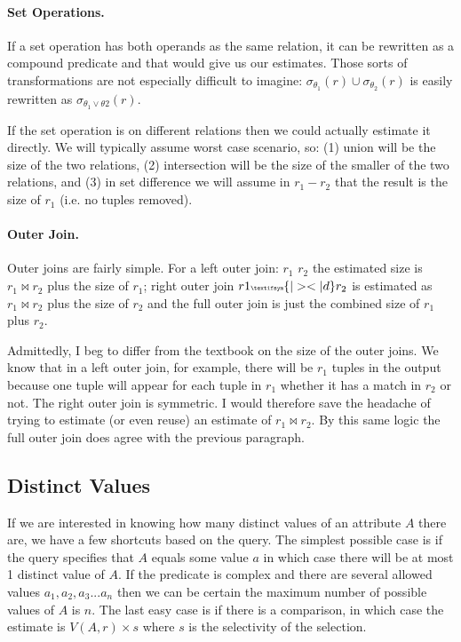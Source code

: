 \paragraph{Set Operations.}

If a set operation has both operands as the same relation, it can be rewritten as a compound predicate and that would give us our estimates. Those sorts of transformations are not especially difficult to imagine: $\sigma_{\theta_{1}}(r) \cup \sigma_{\theta_{2}}(r)$ is easily rewritten as $\sigma_{\theta_{1} \vee \theta{2}}(r)$. 

If the set operation is on different relations then we could actually estimate it directly. We will typically assume worst case scenario, so: (1) union will be the size of the two relations, (2) intersection will be the size of the smaller of the two relations, and (3) in set difference we will assume in $r_{1} - r_{2}$ that the result is the size of $r_{1}$ (i.e. no tuples removed). 


\paragraph{Outer Join.} Outer joins are fairly simple. For a left outer join: $r_{1}$ {\tiny {}} $r_{2}$ the estimated size is $r_{1} \bowtie r_{2}$ plus the size of $r_{1}$; right outer join $r{1} {\tiny \textifsym{|><|d}} r_{2}$ is estimated as $r_{1} \bowtie r_{2}$ plus the size of $r_{2}$ and the full outer join {\tiny {}} is just the combined size of $r_{1}$ plus $r_{2}$.

Admittedly, I beg to differ from the textbook on the size of the outer joins. We know that in a left outer join, for example, there will be $r_{1}$ tuples in the output because one tuple will appear for each tuple in $r_{1}$ whether it has a match in $r_{2}$ or not. The right outer join is symmetric. I would therefore save the headache of trying to estimate (or even reuse) an estimate of $r_{1} \bowtie r_{2}$. By this same logic the full outer join does agree with the previous paragraph.

\subsection*{Distinct Values}

If we are interested in knowing how many distinct values of an attribute $A$ there are, we have a few shortcuts based on the query. The simplest possible case is if the query specifies that $A$ equals some value $a$ in which case there will be at most 1 distinct value of $A$. If the predicate is complex and there are several allowed values $a_{1}, a_{2}, a_{3}... a_{n}$ then we can be certain the maximum number of possible values of $A$ is $n$. The last easy case is if there is a comparison, in which case the estimate is $V(A,r) \times s$ where $s$ is the selectivity of the selection.

